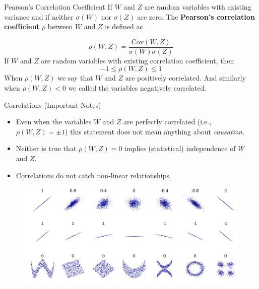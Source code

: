\documentclass{beamer}
\begin{document}
\begin{frame}{Pearson's Correlation Coefficient}
If $W$ and $Z$ are random variables with existing variance and if neither $\sigma(W)$ nor $\sigma(Z)$ are zero. The {\bf Pearson's correlation coefficient} $\rho$ between $W$ and $Z$ is defined as

\begin{equation*}
	\rho(W,Z)= \frac{\textrm{Cov}(W,Z)}{\sigma(W)\sigma(Z)}
\end{equation*}
If $W$ and $Z$ are random variables with existing correlation coefficient, then
\begin{equation*}
	-1 \le \rho(W,Z) \le 1
\end{equation*}
When $\rho(W,Z)$ we say that $W$ and $Z$ are positively correlated. And similarly when $\rho(W,Z) < 0$ we called the variables negatively correlated. 



\end{frame}

\begin{frame}{Correlations (Important Notes)}

\begin{itemize}
	\item Even when the variables $W$ and $Z$ are perfectly correlated (i.e., $\rho(W,Z)= \pm 1$) this statement does not mean anything about {\it causation}. 
	\item Neither is true that $\rho(W,Z)=0$ implies (statistical) independence of $W$ and $Z$.
	\item Correlations do not catch non-linear relationships. 
\end{itemize}
\begin{figure}
\centering
\includegraphics[scale=0.1]{../../Figures/fig_correlations.png}
\end{figure}
\end{frame}
\end{document}
